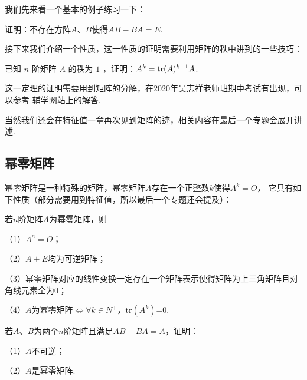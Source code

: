 我们先来看一个基本的例子练习一下：
\begin{example}
	证明：不存在方阵$A$、$B$使得$AB-BA=E$.
\end{example}

接下来我们介绍一个性质，这一性质的证明需要利用矩阵的秩中讲到的一些技巧：
\begin{theorem}
	已知 $n$ 阶矩阵 $A$ 的秩为 $1$ ，证明：$A^k=\textup{tr}(A)^{k-1}A$.
\end{theorem}
这一定理的证明需要用到矩阵的分解，在2020年吴志祥老师班期中考试有出现，可以参考
辅学网站上的解答.

当然我们还会在特征值一章再次见到矩阵的迹，相关内容在最后一个专题会展开讲述.

\subsection{幂零矩阵}
幂零矩阵是一种特殊的矩阵，幂零矩阵$A$存在一个正整数$k$使得$A^k=O$，
它具有如下性质（部分需要用到特征值，所以最后一个专题还会提及）：
\begin{theorem}
	若$n$阶矩阵$A$为幂零矩阵，则

	\textup{（1）}$A^n=O$；

	\textup{（2）}$A\pm E$均为可逆矩阵；

	\textup{（3）}幂零矩阵对应的线性变换一定存在一个矩阵表示使得矩阵为上三角矩阵且对角线元素全为\textup{0}；
	
	\textup{（4）}$A$为幂零矩阵$\iff \forall k \in N^+$，\textup{tr}$(A^k)$=\textup{0}.
\end{theorem}

\begin{example}
	若$A$、$B$为两个$n$阶矩阵且满足$AB-BA=A$，证明：

	\textup{（1）}$A$不可逆；

	\textup{（2）}$A$是幂零矩阵.
\end{example}

